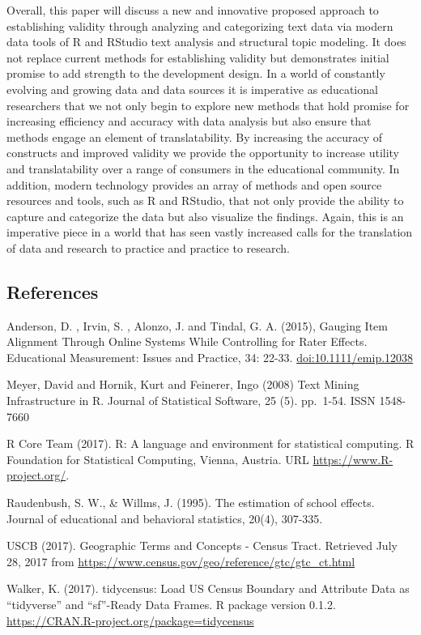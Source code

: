 \documentclass[doc]{apa6}
\theoremstyle{definition}
\theoremstyle{definition}
\theoremstyle{definition}
\theoremstyle{remark}
\begin{document}
Overall, this paper will discuss a new and innovative proposed approach
to establishing validity through analyzing and categorizing text data
via modern data tools of R and RStudio text analysis and structural
topic modeling. It does not replace current methods for establishing
validity but demonstrates initial promise to add strength to the
development design. In a world of constantly evolving and growing data
and data sources it is imperative as educational researchers that we not
only begin to explore new methods that hold promise for increasing
efficiency and accuracy with data analysis but also ensure that methods
engage an element of translatability. By increasing the accuracy of
constructs and improved validity we provide the opportunity to increase
utility and translatability over a range of consumers in the educational
community. In addition, modern technology provides an array of methods
and open source resources and tools, such as R and RStudio, that not
only provide the ability to capture and categorize the data but also
visualize the findings. Again, this is an imperative piece in a world
that has seen vastly increased calls for the translation of data and
research to practice and practice to research.

\subsection{References}\label{references}

Anderson, D. , Irvin, S. , Alonzo, J. and Tindal, G. A. (2015), Gauging
Item Alignment Through Online Systems While Controlling for Rater
Effects. Educational Measurement: Issues and Practice, 34: 22-33.
\url{doi:10.1111/emip.12038}

Meyer, David and Hornik, Kurt and Feinerer, Ingo (2008) Text Mining
Infrastructure in R. Journal of Statistical Software, 25 (5). pp.~1-54.
ISSN 1548-7660

R Core Team (2017). R: A language and environment for statistical
computing. R Foundation for Statistical Computing, Vienna, Austria. URL
\url{https://www.R-project.org/}.

Raudenbush, S. W., \& Willms, J. (1995). The estimation of school
effects. Journal of educational and behavioral statistics, 20(4),
307-335.

USCB (2017). Geographic Terms and Concepts - Census Tract. Retrieved
July 28, 2017 from
\url{https://www.census.gov/geo/reference/gtc/gtc_ct.html}

Walker, K. (2017). tidycensus: Load US Census Boundary and Attribute
Data as \enquote{tidyverse} and \enquote{sf}-Ready Data Frames. R
package version 0.1.2.
\url{https://CRAN.R-project.org/package=tidycensus}
\end{document}
